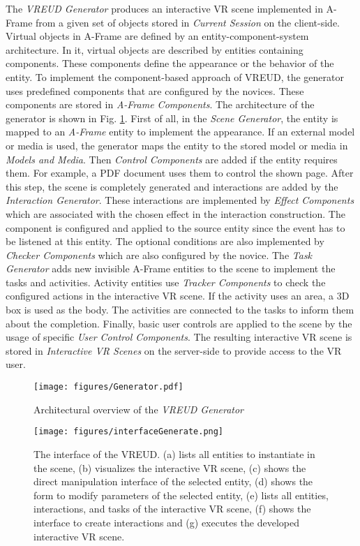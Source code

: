\documentclass[conference]{IEEEtran}
\begin{document}
The \textit{VREUD Generator} produces an interactive \ac{VR} scene implemented in A-Frame from a given set of objects stored in \textit{Current Session} on the client-side. Virtual objects in A-Frame are defined by an entity-component-system architecture. In it, virtual objects are described by entities containing components. These components define the appearance or the behavior of the entity. To implement the component-based approach of VREUD, the generator uses predefined components that are configured by the novices. These components are stored in \textit{A-Frame Components}. The architecture of the generator is shown in Fig. \ref{generator}. First of all, in the \textit{Scene Generator}, the entity is mapped to an \textit{A-Frame} entity to implement the appearance. If an external model or media is used, the generator maps the entity to the stored model or media in \textit{Models and Media}. Then \textit{Control Components} are added if the entity requires them. For example, a PDF document uses them to control the shown page. After this step, the scene is completely generated and interactions are added by the \textit{Interaction Generator}. These interactions are implemented by \textit{Effect Components} which are associated with the chosen effect in the interaction construction. The component is configured and applied to the source entity since the event has to be listened at this entity. The optional conditions are also implemented by \textit{Checker Components} which are also configured by the novice. The \textit{Task Generator} adds new invisible A-Frame entities to the scene to implement the tasks and activities. Activity entities use \textit{Tracker Components} to check the configured actions in the interactive \ac{VR} scene. If the activity uses an area, a 3D box is used as the body. The activities are connected to the tasks to inform them about the completion. Finally, basic user controls are applied to the scene by the usage of specific \textit{User Control Components}. The resulting interactive VR scene is stored in \textit{Interactive VR Scenes} on the server-side to provide access to the \ac{VR} user. 
\begin{figure}[htbp]
\centerline{\texttt{[image: figures/Generator.pdf]}}
\caption{Architectural overview of the \textit{VREUD Generator}}
\label{generator}
\end{figure}

\begin{figure*}[htbp]
\centerline{\texttt{[image: figures/interfaceGenerate.png]}}
\caption{The interface of the VREUD. (a) lists all entities to instantiate in the scene, (b) visualizes the interactive VR scene, (c) shows the direct manipulation interface of the selected entity, (d) shows the form to modify parameters of the selected entity, (e) lists all entities, interactions, and tasks of the interactive \ac{VR} scene, (f) shows the interface to create interactions and (g) executes the developed interactive VR scene.}
\label{interface}
\end{figure*}
\end{document}
